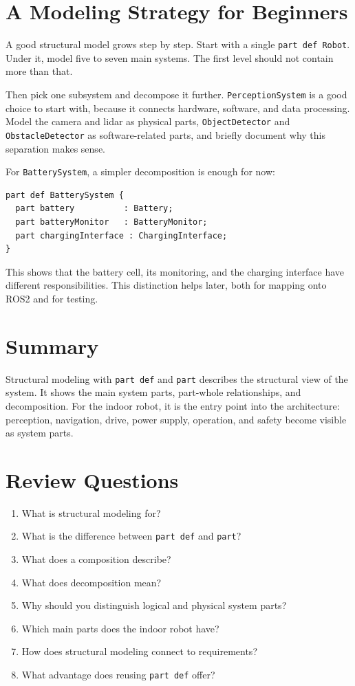 \section{A Modeling Strategy for Beginners}
A good structural model grows step by step. Start with a single \texttt{part def Robot}. Under it, model five to seven main systems. The first level should not contain more than that.

Then pick one subsystem and decompose it further. \texttt{PerceptionSystem} is a good choice to start with, because it connects hardware, software, and data processing. Model the camera and lidar as physical parts, \texttt{ObjectDetector} and \texttt{ObstacleDetector} as software-related parts, and briefly document why this separation makes sense.

For \texttt{BatterySystem}, a simpler decomposition is enough for now:

\begin{lstlisting}
part def BatterySystem {
  part battery          : Battery;
  part batteryMonitor   : BatteryMonitor;
  part chargingInterface : ChargingInterface;
}
\end{lstlisting}

This shows that the battery cell, its monitoring, and the charging interface have different responsibilities. This distinction helps later, both for mapping onto ROS2 and for testing.

\section{Summary}
Structural modeling with \texttt{part def} and \texttt{part} describes the structural view of the system. It shows the main system parts, part-whole relationships, and decomposition. For the indoor robot, it is the entry point into the architecture: perception, navigation, drive, power supply, operation, and safety become visible as system parts.

\section{Review Questions}
\begin{enumerate}
    \item What is structural modeling for?
    \item What is the difference between \texttt{part def} and \texttt{part}?
    \item What does a composition describe?
    \item What does decomposition mean?
    \item Why should you distinguish logical and physical system parts?
    \item Which main parts does the indoor robot have?
    \item How does structural modeling connect to requirements?
    \item What advantage does reusing \texttt{part def} offer?
\end{enumerate}

